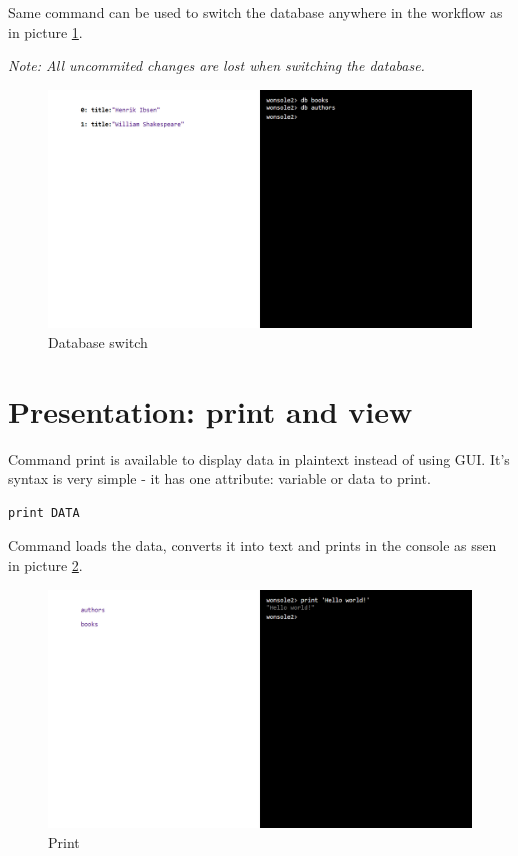 \documentclass[10pt,a4paper,oneside]{report}
\begin{document}
Same command can be used to switch the database anywhere in the workflow as in
picture \ref{wonsole2-04}.

\textit{Note: All uncommited changes are lost when switching the database.}

\begin{figure}
\centering
\includegraphics[width=\textwidth]{screenshot/wonsole2/wonsole2-04.png}
\caption{Database switch}
\label{wonsole2-04}
\end{figure}

\section{Presentation: print and view}
Command print is available to display data in plaintext instead of using GUI.
It's syntax is very simple - it has one attribute: variable or data to print.
\begin{verbatim}
print DATA
\end{verbatim}
Command loads the data, converts it into text and prints in the console as ssen
in picture \ref{wonsole2-10}.

\begin{figure}
\centering
\includegraphics[width=\textwidth]{screenshot/wonsole2/wonsole2-10.png}
\caption{Print}
\label{wonsole2-10}
\end{figure}
\end{document}
